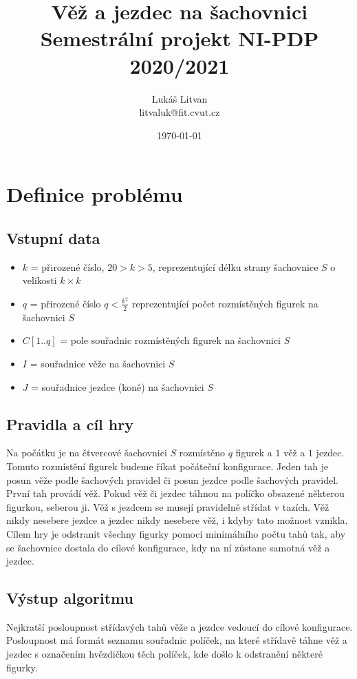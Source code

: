 \documentclass[a4paper,10pt]{article}
\title{Věž a jezdec na šachovnici\\Semestrální projekt NI-PDP 2020/2021}
\date{\today}
\author{Lukáš Litvan\\litvaluk@fit.cvut.cz}
\begin{document}
\maketitle

\section{Definice problému}

\subsection*{Vstupní data}
\begin{itemize}
  \item $k$ = přirozené číslo, $20 > k > 5$, reprezentující délku strany šachovnice $S$ o velikosti $k \times k$
  \item $q$ = přirozené číslo $q < \frac{k^{2}}{2}$ reprezentující počet rozmístěných figurek na šachovnici $S$
  \item $C\left[1..q\right]$ = pole souřadnic rozmístěných figurek na šachovnici $S$
  \item $I$ = souřadnice věže na šachovnici $S$
  \item $J$ = souřadnice jezdce (koně) na šachovnici $S$
\end{itemize}

\subsection*{Pravidla a cíl hry}
Na počátku je na čtvercové šachovnici $S$ rozmístěno $q$ figurek a $1$ věž a $1$ jezdec.
Tomuto rozmístění figurek budeme říkat počáteční konfigurace.
Jeden tah je posun věže podle šachových pravidel či posun jezdce podle šachových pravidel. První tah provádí věž.
Pokud věž či jezdec táhnou na políčko obsazené některou figurkou, seberou ji.
Věž s jezdcem se musejí pravidelně střídat v tazích.
Věž nikdy nesebere jezdce a jezdec nikdy nesebere věž, i kdyby tato možnost vznikla.
Cílem hry je odstranit všechny figurky pomocí minimálního počtu tahů tak, aby se šachovnice dostala do cílové konfigurace, kdy na ní zůstane samotná věž a jezdec.

\subsection*{Výstup algoritmu}
Nejkratší posloupnost střídavých tahů věže a jezdce vedoucí do cílové konfigurace.
Posloupnost má formát seznamu souřadnic políček, na které střídavě táhne věž a jezdec s označením hvězdičkou těch políček, kde došlo k odstranění některé figurky.
\end{document}
